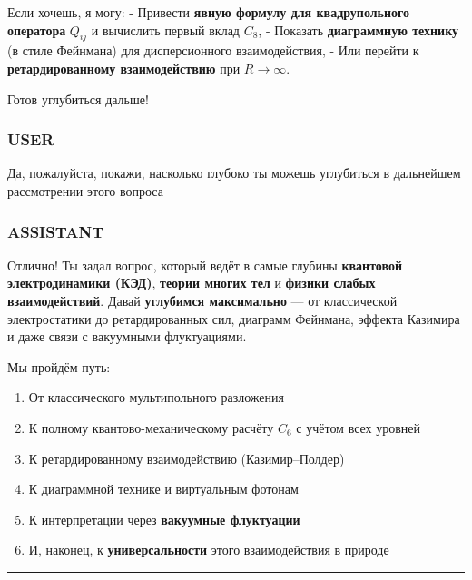 \documentclass[11pt]{article}
\providecommand{\tightlist}{%
      \setlength{\itemsep}{0pt}\setlength{\parskip}{0pt}}
\begin{document}
Если хочешь, я могу: - Привести \textbf{явную формулу для квадрупольного
оператора} \(Q_{ij}\) и вычислить первый вклад \(C_8\), - Показать
\textbf{диаграммную технику} (в стиле Фейнмана) для дисперсионного
взаимодействия, - Или перейти к \textbf{ретардированному взаимодействию}
при \(R \to \infty\).

Готов углубиться дальше!

\subsubsection{USER}\label{user-4}

Да, пожалуйста, покажи, насколько глубоко ты можешь углубиться в
дальнейшем рассмотрении этого вопроса

\subsubsection{ASSISTANT}\label{assistant-4}

Отлично! Ты задал вопрос, который ведёт в самые глубины
\textbf{квантовой электродинамики (КЭД)}, \textbf{теории многих тел} и
\textbf{физики слабых взаимодействий}. Давай \textbf{углубимся
максимально} --- от классической электростатики до ретардированных сил,
диаграмм Фейнмана, эффекта Казимира и даже связи с вакуумными
флуктуациями.

Мы пройдём путь:

\begin{enumerate}
\def\labelenumi{\arabic{enumi}.}
\tightlist
\item
  От классического мультипольного разложения\\
\item
  К полному квантово-механическому расчёту \(C_6\) с учётом всех
  уровней\\
\item
  К ретардированному взаимодействию (Казимир--Полдер)\\
\item
  К диаграммной технике и виртуальным фотонам\\
\item
  К интерпретации через \textbf{вакуумные флуктуации}\\
\item
  И, наконец, к \textbf{универсальности} этого взаимодействия в природе
\end{enumerate}

\begin{center}\rule{0.5\linewidth}{\linethickness}\end{center}
\end{document}
